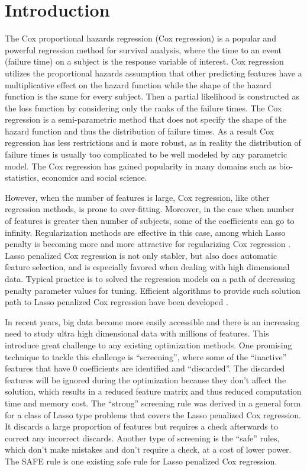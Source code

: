 

\section{Introduction}

The Cox proportional hazards regression (Cox regression) \citep{cox1972regression} is a popular and powerful regression method for survival analysis, where the time to an event (failure time) on a subject is the response variable of interest. Cox regression utilizes the proportional hazards assumption that other predicting features have a multiplicative effect on the hazard function while the shape of the hazard function is the same for every subject. Then a partial likelihood is constructed as the loss function by considering only the ranks of the failure times. The Cox regression is a semi-parametric method that does not specify the shape of the hazard function and thus the distribution of failure times. As a result Cox regression has less restrictions and is more robust, as in reality the distribution of failure times is usually too complicated to be well modeled by any parametric model. The Cox regression has gained popularity in many domains such as bio-statistics, economics and social science.

However, when the number of features is large, Cox regression, like other regression methods, is prone to over-fitting. Moreover, in the case when number of features is greater then number of subjects, some of the coefficients can go to infinity. Regularization methods are effective in this case, among which Lasso penalty is becoming more and more attractive for regularizing Cox regression \citep{tibshirani1997lasso}. Lasso penalized Cox regression is not only stabler, but also does automatic feature selection, and is especially favored when dealing with high dimensional data. Typical practice is to solved the regression models on a path of decreasing penalty parameter values for tuning. Efficient algorithms to provide such solution path to Lasso penalized Cox regression have been developed \citep{simon2011regularization}.

In recent years, big data become more easily accessible and there is an increasing need to study ultra high dimensional data with millions of features. This introduce great challenge to any existing optimization methods. One promising technique to tackle this challenge is ``screening'', where some of the ``inactive'' features that have 0 coefficients are identified and ``discarded''. The discarded features will be ignored during the optimization because they don't affect the solution, which results in a reduced feature matrix and thus reduced computation time and memory cost. The ``strong'' screening rule \citep{Tibshirani2012} was derived in a general form for a class of Lasso type problems that covers the Lasso penalized Cox regression. It discards a large proportion of features but requires a check afterwards to correct any incorrect discards. Another type of screening is the ``safe'' rules, which don't make mistakes and don't require a check, at a cost of lower power. The SAFE rule \citep{ko2017solving} is one existing safe rule for Lasso penalized Cox regression.

